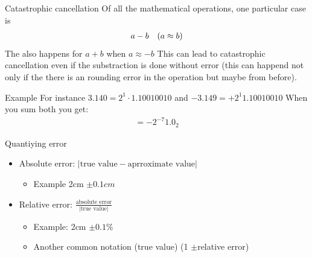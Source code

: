 \begin{parag}{Catastrophic cancellation}
    Of all the mathematical operations, one particular case is 
    \begin{align*} a - b \mathspace \left(a \approx b\right) \end{align*}
    The also happens for $a + b$ when $a \approx -b$ This can lead to catastrophic cancellation even if the substraction is done without error (this can happend not only if the there is an rounding error in the operation but maybe from before).
    \begin{subparag}{Example}
        For instance $3.140 = 2^1 \cdot 1.10010010$ and $-3.149 = + 2^1 1.10010010$
	When you sum both you get:
	\begin{align*} = -2^{-7} 1.0_2 \end{align*}
    \end{subparag}
\end{parag}


\begin{parag}{Quantiying error}
    \begin{itemize}
	    \item Absolute error: $\left|\text{true value} - \text{aprroximate value}\right|$
		    \begin{itemize}
			    \item Example 2cm $\pm 0.1 cm$
		    \end{itemize}
	    \item Relative error: $\frac{\text{absolute error}}{\left|\text{true value}\right|}$
		    \begin{itemize}
			    \item Example: 2cm $\pm 0.1 \%$
			    \item Another common notation (true value) (1 $\pm $relative error)
		    \end{itemize}
		    
    \end{itemize}
    
\end{parag}





